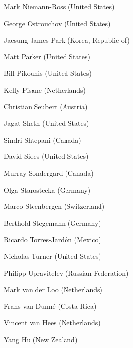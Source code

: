 Mark Niemann-Ross (United States)

George Ostrouchov (United States)

Jaesung James Park (Korea, Republic of)

Matt Parker (United States)

Bill Pikounis (United States)

Kelly Pisane (Netherlands)

Christian Seubert (Austria)

Jagat Sheth (United States)

Sindri Shtepani (Canada)

David Sides (United States)

Murray Sondergard (Canada)

Olga Starostecka (Germany)

Marco Steenbergen (Switzerland)

Berthold Stegemann (Germany)

Ricardo Torres-Jardón (Mexico)

Nicholas Turner (United States)

Philipp Upravitelev (Russian Federation)

Mark van der Loo (Netherlands)

Frans van Dunné (Costa Rica)

Vincent van Hees (Netherlands)

Yang Hu (New Zealand)


\address{%
Torsten Hothorn\\
Universität Zürich\\%
Switzerland\\
%
%
\textit{ORCiD: \href{https://orcid.org/0000-0001-8301-0471}{0000-0001-8301-0471}}\\%
\href{mailto:Torsten.Hothorn@R-project.org}{\nolinkurl{Torsten.Hothorn@R-project.org}}%
}
